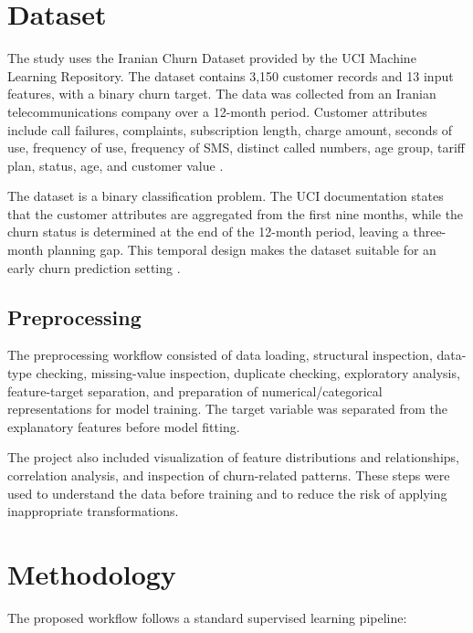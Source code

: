 \documentclass[conference]{IEEEtran}
\begin{document}
\clearpage
\section{Dataset}
The study uses the Iranian Churn Dataset provided by the UCI Machine Learning Repository. The dataset contains 3,150 customer records and 13 input features, with a binary churn target. The data was collected from an Iranian telecommunications company over a 12-month period. Customer attributes include call failures, complaints, subscription length, charge amount, seconds of use, frequency of use, frequency of SMS, distinct called numbers, age group, tariff plan, status, age, and customer value \cite{uci2020}.

The dataset is a binary classification problem. The UCI documentation states that the customer attributes are aggregated from the first nine months, while the churn status is determined at the end of the 12-month period, leaving a three-month planning gap. This temporal design makes the dataset suitable for an early churn prediction setting \cite{uci2020}.

\subsection{Preprocessing}
The preprocessing workflow consisted of data loading, structural inspection, data-type checking, missing-value inspection, duplicate checking, exploratory analysis, feature-target separation, and preparation of numerical/categorical representations for model training. The target variable was separated from the explanatory features before model fitting.

The project also included visualization of feature distributions and relationships, correlation analysis, and inspection of churn-related patterns. These steps were used to understand the data before training and to reduce the risk of applying inappropriate transformations.

\clearpage
\section{Methodology}
The proposed workflow follows a standard supervised learning pipeline:
\end{document}
